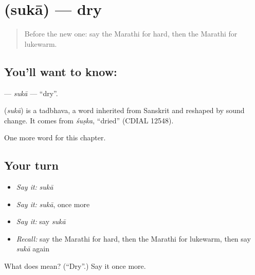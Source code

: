 \section[\texorpdfstring{\mr{सुका} (sukā)}{सुका (sukā)}]{ (sukā) — dry}

\label{lesson:MR-C148-suka}



\begin{quote}
Before the new one: say the Marathi for hard, then the Marathi for lukewarm.
\end{quote}

\subsection*{You'll want to know: }
\textbf{} — \emph{sukā} — \textquotedblleft{}dry\textquotedblright{}.

\begin{cousinweb}
\textbf{} (\emph{sukā}) is a tadbhava, a word inherited from Sanskrit and reshaped by sound change. It comes from \emph{śuṣka}, \textquotedblleft{}dried\textquotedblright{} (CDIAL 12548).
\end{cousinweb}

\begin{grammarlens}[title={What you've built}]
One more word for this chapter.
\end{grammarlens}

\subsection*{Your turn}
\begin{itemize}
\raggedright
  \item \emph{Say it:} \emph{sukā}
  \item \emph{Say it:} \emph{sukā}, once more
  \item \emph{Say it:} say \emph{sukā}
  \item \emph{Recall:} say the Marathi for hard, then the Marathi for lukewarm, then say \emph{sukā} again
\end{itemize}

\begin{tcolorbox}[breakable,colback=teal!4,colframe=teal!35!black,title={Before you move on}]
What does  mean? (\textquotedblleft{}Dry\textquotedblright{}.) Say it once more.
\end{tcolorbox}
